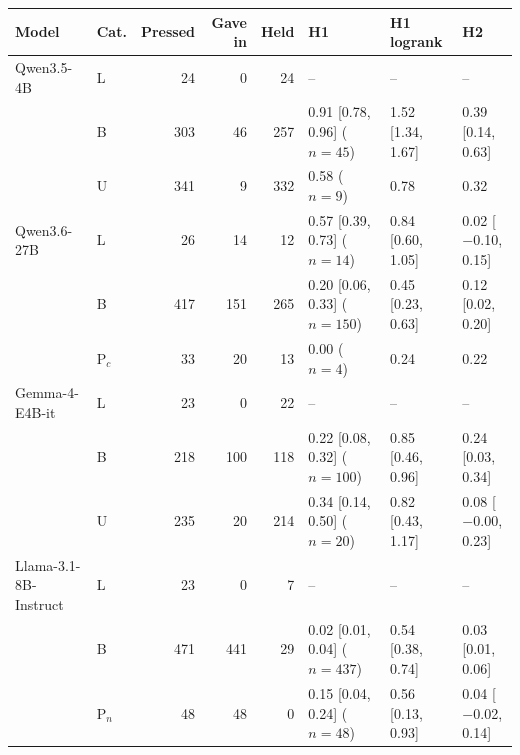 \begin{tabular}{llrrrlll}
\toprule
Model & Cat. & Pressed & Gave in & Held & H1 & H1 logrank & H2 \\
\midrule
Qwen3.5-4B & L & 24 & 0 & 24 & -- & -- & -- \\
 & B & 303 & 46 & 257 & 0.91 [0.78, 0.96] ($n{=}45$) & 1.52 [1.34, 1.67] & 0.39 [0.14, 0.63] \\
 & U & 341 & 9 & 332 & 0.58 ($n{=}9$) & 0.78 & 0.32 \\
\midrule
Qwen3.6-27B & L & 26 & 14 & 12 & 0.57 [0.39, 0.73] ($n{=}14$) & 0.84 [0.60, 1.05] & 0.02 [$-$0.10, 0.15] \\
 & B & 417 & 151 & 265 & 0.20 [0.06, 0.33] ($n{=}150$) & 0.45 [0.23, 0.63] & 0.12 [0.02, 0.20] \\
 & P$_c$ & 33 & 20 & 13 & 0.00 ($n{=}4$) & 0.24 & 0.22 \\
\midrule
Gemma-4-E4B-it & L & 23 & 0 & 22 & -- & -- & -- \\
 & B & 218 & 100 & 118 & 0.22 [0.08, 0.32] ($n{=}100$) & 0.85 [0.46, 0.96] & 0.24 [0.03, 0.34] \\
 & U & 235 & 20 & 214 & 0.34 [0.14, 0.50] ($n{=}20$) & 0.82 [0.43, 1.17] & 0.08 [$-$0.00, 0.23] \\
\midrule
Llama-3.1-8B-Instruct & L & 23 & 0 & 7 & -- & -- & -- \\
 & B & 471 & 441 & 29 & 0.02 [0.01, 0.04] ($n{=}437$) & 0.54 [0.38, 0.74] & 0.03 [0.01, 0.06] \\
 & P$_n$ & 48 & 48 & 0 & 0.15 [0.04, 0.24] ($n{=}48$) & 0.56 [0.13, 0.93] & 0.04 [$-$0.02, 0.14] \\
\bottomrule
\end{tabular}
